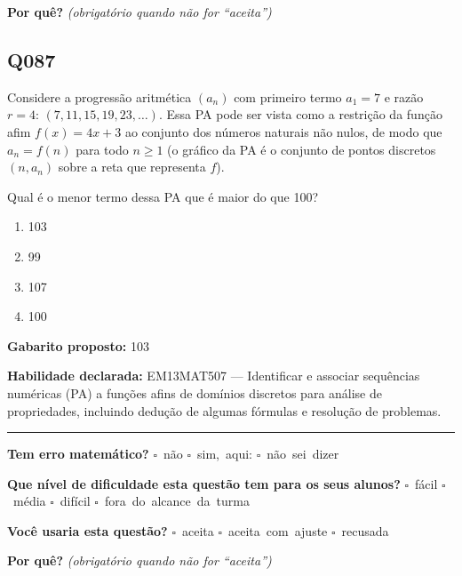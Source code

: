 \documentclass[11pt,a4paper]{article}
\begin{document}
\textbf{Por quê?} \emph{(obrigatório quando não for ``aceita'')}

\underline{\hspace{\linewidth}}

\underline{\hspace{\linewidth}}
\vspace{0.6em}

\begin{samepage}
\subsection*{Q087}
Considere a progressão aritmética $(a_n)$ com primeiro termo $a_1 = 7$ e razão $r = 4$: $(7, 11, 15, 19, 23, \dots)$. Essa PA pode ser vista como a restrição da função afim $f(x) = 4x + 3$ ao conjunto dos números naturais não nulos, de modo que $a_n = f(n)$ para todo $n \geq 1$ (o gráfico da PA é o conjunto de pontos discretos $(n, a_n)$ sobre a reta que representa $f$).

Qual é o menor termo dessa PA que é maior do que 100?
\begin{enumerate}[label=(\alph*),nosep,leftmargin=*]
\item 103
\item 99
\item 107
\item 100
\end{enumerate}

\textbf{Gabarito proposto:} 103

\textbf{Habilidade declarada:} EM13MAT507 --- Identificar e associar sequências numéricas (PA) a funções afins de domínios discretos para análise de propriedades, incluindo dedução de algumas fórmulas e resolução de problemas.
\end{samepage}

\noindent\rule{\linewidth}{0.4pt}
\textbf{Tem erro matemático?}\quad
\mbox{$\square$~não} \quad \mbox{$\square$~sim, aqui:} \underline{\hspace{5cm}}
\quad \mbox{$\square$~não sei dizer}

\textbf{Que nível de dificuldade esta questão tem para os seus alunos?}\quad
\mbox{$\square$~fácil} \quad \mbox{$\square$~média} \quad
\mbox{$\square$~difícil} \quad \mbox{$\square$~fora do alcance da turma}

\textbf{Você usaria esta questão?}\quad
\mbox{$\square$~aceita} \quad \mbox{$\square$~aceita com ajuste} \quad
\mbox{$\square$~recusada}

\textbf{Por quê?} \emph{(obrigatório quando não for ``aceita'')}
\end{document}
